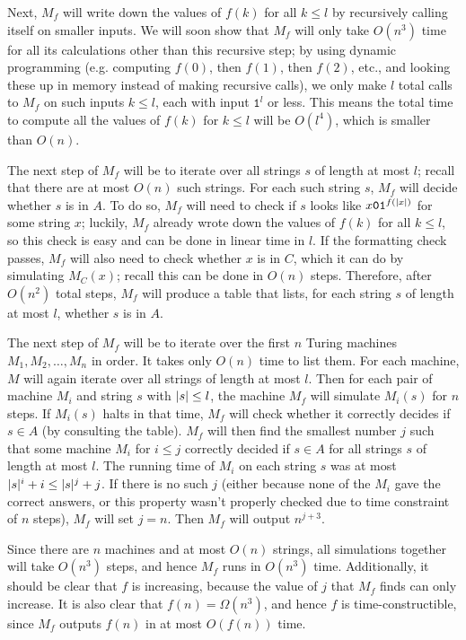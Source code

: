 \documentclass[11pt,twoside=off,numbers=noenddot]{scrbook}
\begin{document}
Next, $M_f$ will write down the values of $f(k)$ for all $k \leq l$ by recursively calling itself on smaller inputs. We will soon show that $M_f$ will only take $O(n^3)$ time for all its calculations other than this recursive step; by using dynamic programming (e.g. computing $f(0)$, then $f(1)$, then $f(2)$, etc., and looking these up in memory instead of making recursive calls), we only make $l$ total calls to $M_f$ on such inputs $k \leq l$, each with input $\texttt{1}^l$ or less. This means the total time to compute all the values of $f(k)$ for $k \leq l$ will be $O(l^4)$, which is smaller than $O(n)$.

The next step of $M_f$ will be to iterate over all strings $s$ of length at most $l$; recall that there are at most $O(n)$ such strings. For each such string $s$, $M_f$ will decide whether $s$ is in $A$. To do so, $M_f$ will need to check if $s$ looks like $x\texttt{0}\texttt{1}^{f(| x |)}$ for some string $x$; luckily, $M_f$ already wrote down the values of $f(k)$ for all $k \leq l$, so this check is easy and can be done in linear time in $l$. If the formatting check passes, $M_f$ will also need to check whether $x$ is in $C$, which it can do by simulating $M_C(x)$; recall this can be done in $O(n)$ steps. Therefore, after $O(n^2)$ total steps, $M_f$ will produce a table that lists, for each string $s$ of length at most $l$, whether $s$ is in $A$.

The next step of $M_f$ will be to iterate over the first $n$ Turing machines $M_1, M_2, \dots, M_n$ in order. It takes only $O(n)$ time to list them. For each machine, $M$ will again iterate over all strings of length at most $l$. Then for each pair of machine $M_i$ and string $s$ with $| s | \leq l$, the machine $M_f$ will simulate $M_i(s)$ for $n$ steps. If $M_i(s)$ halts in that time, $M_f$ will check whether it correctly decides if $s \in A$ (by consulting the table). $M_f$ will then find the smallest number $j$ such that some machine $M_i$ for $i \leq j$ correctly decided if $s \in A$ for all strings $s$ of length at most $l$. The running time of $M_i$ on each string $s$ was at most $| s |^i + i \leq | s |^j + j$. If there is no such $j$ (either because none of the $M_i$ gave the correct answers, or this property wasn't properly checked due to time constraint of $n$ steps), $M_f$ will set $j = n$. Then $M_f$ will output $n^{j + 3}$.

Since there are $n$ machines and at most $O(n)$ strings, all simulations together will take $O(n^3)$ steps, and hence $M_f$ runs in $O(n^3)$ time. Additionally, it should be clear that $f$ is increasing, because the value of $j$ that $M_f$ finds can only increase. It is also clear that $f(n) = \Omega(n^3)$, and hence $f$ is time-constructible, since $M_f$ outputs $f(n)$ in at most $O(f(n))$ time.
\end{document}

